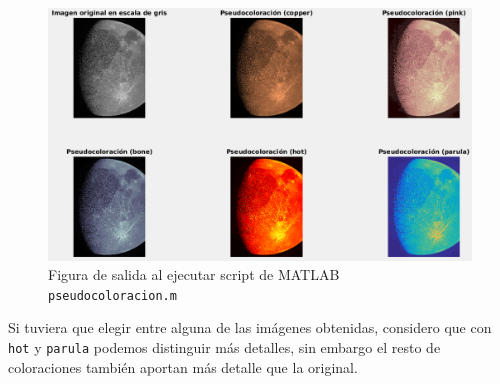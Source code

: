 \documentclass[12pt]{article}
\begin{document}
	\begin{figure}[h]
		\begin{center}
			\includegraphics[width=1\textwidth]{img/pseudocoloracion_output.png}
			\caption{Figura de salida al ejecutar script de MATLAB \texttt{pseudocoloracion.m}}
			\label{img: pseudocoloracion output}
		\end{center}
	\end{figure}

	\noindent Si tuviera que elegir entre alguna de las imágenes obtenidas, considero que con \texttt{hot} y \texttt{parula} podemos distinguir más detalles, sin embargo el resto de coloraciones también aportan más detalle que la original.
	
	\pagebreak
\end{document}
